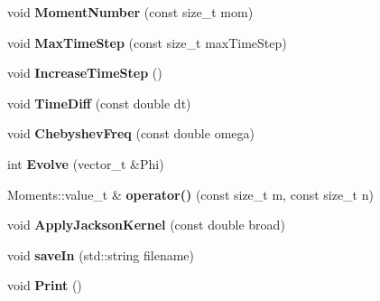 \begin{DoxyCompactItemize}
\item 
void {\bfseries Moment\+Number} (const size\+\_\+t mom)\hypertarget{classchebyshev_1_1_moments_t_d_aae4fff392f904dd619efc25ec6277a54}{}\label{classchebyshev_1_1_moments_t_d_aae4fff392f904dd619efc25ec6277a54}

\item 
void {\bfseries Max\+Time\+Step} (const size\+\_\+t max\+Time\+Step)\hypertarget{classchebyshev_1_1_moments_t_d_ac6eae9b87f5a2103c09ac2265222ac09}{}\label{classchebyshev_1_1_moments_t_d_ac6eae9b87f5a2103c09ac2265222ac09}

\item 
void {\bfseries Increase\+Time\+Step} ()\hypertarget{classchebyshev_1_1_moments_t_d_a4d19c846719c7bc576600eb1f0f3f3f5}{}\label{classchebyshev_1_1_moments_t_d_a4d19c846719c7bc576600eb1f0f3f3f5}

\item 
void {\bfseries Time\+Diff} (const double dt)\hypertarget{classchebyshev_1_1_moments_t_d_a9affd36141c4059c717c4a1eef6c7e19}{}\label{classchebyshev_1_1_moments_t_d_a9affd36141c4059c717c4a1eef6c7e19}

\item 
void {\bfseries Chebyshev\+Freq} (const double omega)\hypertarget{classchebyshev_1_1_moments_t_d_a874d2bedb2c1a513a48e900a51ec326e}{}\label{classchebyshev_1_1_moments_t_d_a874d2bedb2c1a513a48e900a51ec326e}

\item 
int {\bfseries Evolve} (vector\+\_\+t \&Phi)\hypertarget{classchebyshev_1_1_moments_t_d_a7ddcaee940fd8714ab29f2feaf27633a}{}\label{classchebyshev_1_1_moments_t_d_a7ddcaee940fd8714ab29f2feaf27633a}

\item 
Moments\+::value\+\_\+t \& {\bfseries operator()} (const size\+\_\+t m, const size\+\_\+t n)\hypertarget{classchebyshev_1_1_moments_t_d_a4ee4f9b5054eb24333d0b0197a0f216b}{}\label{classchebyshev_1_1_moments_t_d_a4ee4f9b5054eb24333d0b0197a0f216b}

\item 
void {\bfseries Apply\+Jackson\+Kernel} (const double broad)\hypertarget{classchebyshev_1_1_moments_t_d_a1a208ca21d6b3215ad22ea57653ee156}{}\label{classchebyshev_1_1_moments_t_d_a1a208ca21d6b3215ad22ea57653ee156}

\item 
void {\bfseries save\+In} (std\+::string filename)\hypertarget{classchebyshev_1_1_moments_t_d_aa0ee4348b1e5d27234d7c5c4125b3cea}{}\label{classchebyshev_1_1_moments_t_d_aa0ee4348b1e5d27234d7c5c4125b3cea}

\item 
void {\bfseries Print} ()\hypertarget{classchebyshev_1_1_moments_t_d_a4439f202d47ede1ddd13ade33442d180}{}\label{classchebyshev_1_1_moments_t_d_a4439f202d47ede1ddd13ade33442d180}

\end{DoxyCompactItemize}
